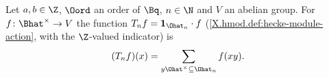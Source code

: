 Let $a,b\in\Z$, $\Oord$ an order of $\Bq$, $n\in\N$ and $V$ an abelian group. For $f\colon\Bhat^\times\to V$ the function
$T_nf=\mathbf 1_{\Ohat_n}\cdot f$ (\cref{X.hmod.def:hecke-module-action}, with the $\Z$-valued indicator) is
\[
  (T_nf)(x)=\sum_{y\Ohat^\times\subseteq\Ohat_n}f(xy).
\]
